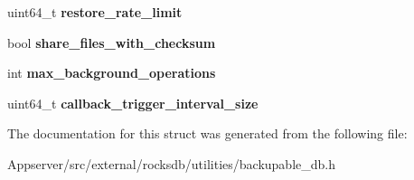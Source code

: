 \begin{DoxyCompactItemize}
\item 
uint64\+\_\+t {\bfseries restore\+\_\+rate\+\_\+limit}\hypertarget{structrocksdb_1_1BackupableDBOptions_ae3ad471d72bcde1f18ed8abb98dea54c}{}\label{structrocksdb_1_1BackupableDBOptions_ae3ad471d72bcde1f18ed8abb98dea54c}

\item 
bool {\bfseries share\+\_\+files\+\_\+with\+\_\+checksum}\hypertarget{structrocksdb_1_1BackupableDBOptions_a859edcb7ddb3d70c594b18b8d49f4620}{}\label{structrocksdb_1_1BackupableDBOptions_a859edcb7ddb3d70c594b18b8d49f4620}

\item 
int {\bfseries max\+\_\+background\+\_\+operations}\hypertarget{structrocksdb_1_1BackupableDBOptions_a80a0fdfbc03c6cac8d45bf9d136081d6}{}\label{structrocksdb_1_1BackupableDBOptions_a80a0fdfbc03c6cac8d45bf9d136081d6}

\item 
uint64\+\_\+t {\bfseries callback\+\_\+trigger\+\_\+interval\+\_\+size}\hypertarget{structrocksdb_1_1BackupableDBOptions_aea04efe346765be3010dee7b0bfec46c}{}\label{structrocksdb_1_1BackupableDBOptions_aea04efe346765be3010dee7b0bfec46c}

\end{DoxyCompactItemize}


The documentation for this struct was generated from the following file\+:\begin{DoxyCompactItemize}
\item 
Appserver/src/external/rocksdb/utilities/backupable\+\_\+db.\+h\end{DoxyCompactItemize}
